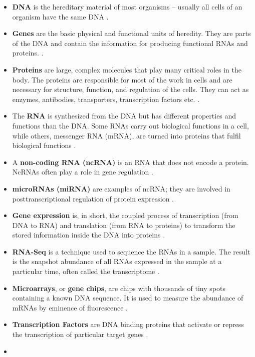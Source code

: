 \documentclass[
]{book}
\begin{document}
\begin{itemize}
\item
  \textbf{DNA} is the hereditary material of most organisms -- usually all cells of an organism have the same DNA \citep{Slack2013}.
\item
  \textbf{Genes} are the basic physical and functional units of heredity. They are parts of the DNA and contain the information for producing functional RNAs and proteins. \citep{Slack2013}.
\item
  \textbf{Proteins} are large, complex molecules that play many critical roles in the body. The proteins are responsible for most of the work in cells and are necessary for structure, function, and regulation of the cells. They can act as enzymes, antibodies, transporters, transcription factors etc. \citep{Slack2013}.
\item
  The \textbf{RNA} is synthesized from the DNA but has different properties and functions than the DNA. Some RNAs carry out biological functions in a cell, while others, messenger RNA (mRNA), are turned into proteins that fulfil biological functions \citep{Slack2013}.
\item
  A \textbf{non-coding RNA (ncRNA)} is an RNA that does not encode a protein. NcRNAs often play a role in gene regulation \citep{MattickNon-codingRNA}.
\item
  \textbf{microRNAs (miRNA)} are examples of ncRNA; they are involved in posttranscriptional regulation of protein expression \citep{Tanase2012MicroRNAs}.
\item
  \textbf{Gene expression} is, in short, the coupled process of transcription (from DNA to RNA) and translation (from RNA to proteins) to transform the stored information inside the DNA into proteins \citep{Slack2013}.
\item
  \textbf{RNA-Seq} is a technique used to sequence the RNAs in a sample. The result is the snapshot abundance of all RNAs expressed in the sample at a particular time, often called the transcriptome \citep{Metzker2010SequencingGeneration}.
\item
  \textbf{Microarrays}, or \textbf{gene chips}, are chips with thousands of tiny spots containing a known DNA sequence. It is used to measure the abundance of mRNAs by eminence of fluorescence \citep{Slack2013}.
\item
  \textbf{Transcription Factors} are DNA binding proteins that activate or repress the transcription of particular target genes \citep{Latchman1997TranscriptionOverview}.
\item

\end{itemize}
\end{document}
